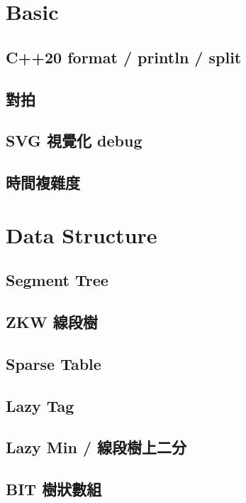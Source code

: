 \section{Basic}

\subsection{C++20 format / println / split}

\subsection{對拍}


\subsection{SVG 視覺化 debug}

\subsection{時間複雜度}


\section{Data Structure}

\subsection{Segment Tree}

\subsection{ZKW 線段樹}

\subsection{Sparse Table}

\subsection{Lazy Tag}

\subsection{Lazy Min / 線段樹上二分}

\subsection{BIT 樹狀數組}

